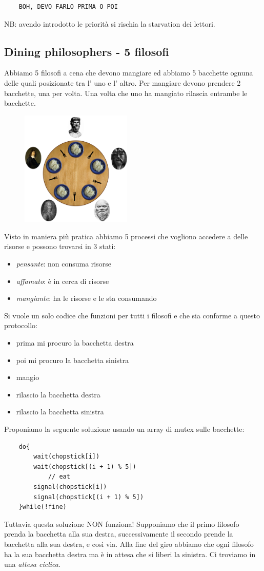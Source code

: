\begin{verbatim}
    BOH, DEVO FARLO PRIMA O POI
\end{verbatim}
NB: avendo introdotto le priorità si rischia la starvation dei lettori.

\subsection{Dining philosophers - 5 filosofi}
Abbiamo 5 filosofi a cena che devono mangiare ed abbiamo 5 bacchette ognuna delle quali posizionate tra l' uno e l' altro.
Per mangiare devono prendere 2 bacchette, una per volta.
Una volta che uno ha mangiato rilascia entrambe le bacchette.
\begin{figure}[H]
    \centering
    \includegraphics[width=200px]{images/6_Sincronizzazione_tra_processi/dining_philosophers_problem.png}
\end{figure}
Visto in maniera più pratica abbiamo 5 processi che vogliono accedere a delle risorse e possono trovarsi in 3 stati:
\begin{itemize}
    \item \emph{pensante}: non consuma risorse
    \item \emph{affamato}: è in cerca di risorse 
    \item \emph{mangiante}: ha le risorse e le sta consumando
\end{itemize}
Si vuole un solo codice che funzioni per tutti i filosofi e che sia conforme a questo protocollo:
\begin{itemize}
    \item prima mi procuro la bacchetta destra
    \item poi mi procuro la bacchetta sinistra
    \item mangio
    \item rilascio la bacchetta destra
    \item rilascio la bacchetta sinistra
\end{itemize}
Proponiamo la seguente soluzione usando un array di mutex sulle bacchette:
\begin{verbatim}
    do{
        wait(chopstick[i])
        wait(chopstick[(i + 1) % 5])
            // eat
        signal(chopstick[i])
        signal(chopstick[(i + 1) % 5])
    }while(!fine)
\end{verbatim}
Tuttavia questa soluzione NON funziona!
Supponiamo che il primo filosofo prenda la bacchetta alla sua destra, successivamente il secondo prende la bacchetta alla sua destra, e così via.
Alla fine del giro abbiamo che ogni filosofo ha la sua bacchetta destra ma è in attesa che si liberi la sinistra.
Ci troviamo in una \emph{attesa ciclica}.

